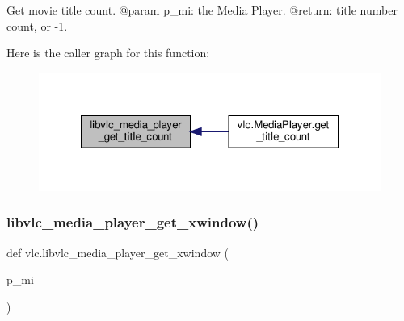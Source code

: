 \begin{DoxyVerb}Get movie title count.
@param p_mi: the Media Player.
@return: title number count, or -1.
\end{DoxyVerb}
 Here is the caller graph for this function\+:
\nopagebreak
\begin{figure}[H]
\begin{center}
\leavevmode
\includegraphics[width=321pt]{namespacevlc_a928f5b0cc17b98170b0a0bf9b045a504_icgraph}
\end{center}
\end{figure}
\mbox{\label{namespacevlc_a9d0e29b3ab21c037abe445f60d224ae9}} 
\subsubsection{\texorpdfstring{libvlc\+\_\+media\+\_\+player\+\_\+get\+\_\+xwindow()}{libvlc\_media\_player\_get\_xwindow()}}
{\footnotesize\ttfamily def vlc.\+libvlc\+\_\+media\+\_\+player\+\_\+get\+\_\+xwindow (\begin{DoxyParamCaption}\item[{}]{p\+\_\+mi }\end{DoxyParamCaption})}

